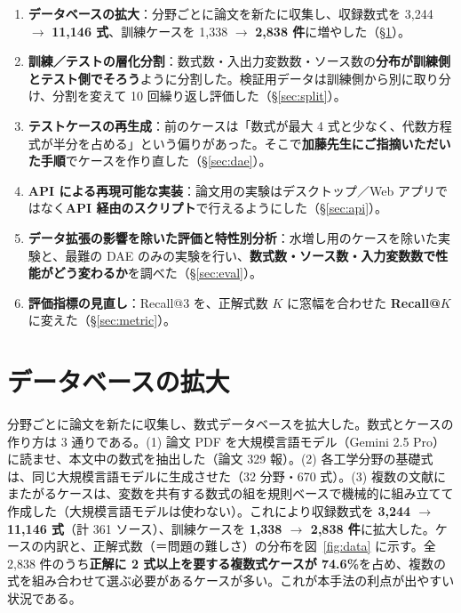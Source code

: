 \documentclass[a4j,dvipdfmx,12pt]{jresume}
\begin{document}
\begin{enumerate}[leftmargin=1.8em]
  \item \textbf{データベースの拡大}：分野ごとに論文を新たに収集し、収録数式を 3{,}244 $\to$ \textbf{11{,}146 式}、訓練ケースを 1{,}338 $\to$ \textbf{2{,}838 件}に増やした（\S\ref{sec:db}）。
  \item \textbf{訓練／テストの層化分割}：数式数・入出力変数数・ソース数の\textbf{分布が訓練側とテスト側でそろう}ように分割した。検証用データは訓練側から別に取り分け、分割を変えて 10 回繰り返し評価した（\S\ref{sec:split}）。
  \item \textbf{テストケースの再生成}：前のケースは「数式が最大 4 式と少なく、代数方程式が半分を占める」という偏りがあった。そこで\textbf{加藤先生にご指摘いただいた手順}でケースを作り直した（\S\ref{sec:dae}）。
  \item \textbf{API による再現可能な実装}：論文用の実験はデスクトップ／Web アプリではなく\textbf{API 経由のスクリプト}で行えるようにした（\S\ref{sec:api}）。
  \item \textbf{データ拡張の影響を除いた評価と特性別分析}：水増し用のケースを除いた実験と、最難の DAE のみの実験を行い、\textbf{数式数・ソース数・入力変数数で性能がどう変わるか}を調べた（\S\ref{sec:eval}）。
  \item \textbf{評価指標の見直し}：Recall@3 を、正解式数 $K$ に窓幅を合わせた \textbf{Recall@$K$} に変えた（\S\ref{sec:metric}）。
\end{enumerate}

\section{データベースの拡大}\label{sec:db}
分野ごとに論文を新たに収集し、数式データベースを拡大した。数式とケースの作り方は 3 通りである。(1) 論文 PDF を大規模言語モデル（Gemini 2.5 Pro）に読ませ、本文中の数式を抽出した（論文 329 報）。(2) 各工学分野の基礎式は、同じ大規模言語モデルに生成させた（32 分野・670 式）。(3) 複数の文献にまたがるケースは、変数を共有する数式の組を規則ベースで機械的に組み立てて作成した（大規模言語モデルは使わない）。これにより収録数式を \textbf{3{,}244 $\to$ 11{,}146 式}（計 361 ソース）、訓練ケースを \textbf{1{,}338 $\to$ 2{,}838 件}に拡大した。ケースの内訳と、正解式数（＝問題の難しさ）の分布を図~\ref{fig:data} に示す。全 2{,}838 件のうち\textbf{正解に 2 式以上を要する複数式ケースが 74.6\%}を占め、複数の式を組み合わせて選ぶ必要があるケースが多い。これが本手法の利点が出やすい状況である。
\end{document}

